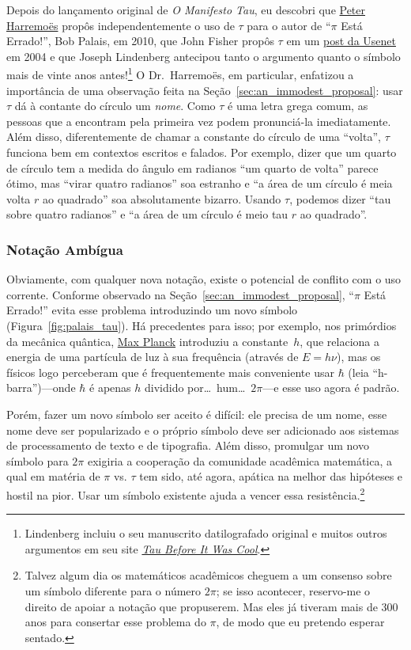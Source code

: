 {Depois do lançamento original de \emph{O Manifesto Tau}, eu descobri que \href{http://www.harremoes.dk/Peter/}{Peter Harremo\"{e}s} propôs independentemente o uso de $\tau$ para o autor de ``$\pi$ Está Errado!'', Bob Palais, em 2010, que John Fisher propôs $\tau$ em um \href{https://groups.google.com/forum/#!msg/sci.math/c-DHmJHSA0A/sLCoOtHB1UAJ}{post da Usenet} em 2004 e que Joseph Lindenberg antecipou tanto o argumento quanto o símbolo mais de vinte anos antes!\footnote{Lindenberg incluiu o seu manuscrito datilografado original e muitos outros argumentos em seu site \href{https://sites.google.com/site/taubeforeitwascool/}{\emph{Tau Before It Was Cool}}.} O Dr.~Harremo\"{e}s, em particular, enfatizou a importância de uma observação feita na Seção~\ref{sec:an_immodest_proposal}: usar $\tau$ dá à contante do círculo um \emph{nome}. Como $\tau$ é uma letra grega comum, as pessoas que a encontram pela primeira vez podem pronunciá-la imediatamente. Além disso, diferentemente de chamar a constante do círculo de uma ``volta'', $\tau$ funciona bem em contextos escritos e falados. Por exemplo, dizer que um quarto de círculo tem a medida do ângulo em radianos ``um quarto de volta'' parece ótimo, mas ``virar quatro radianos'' soa estranho e ``a área de um círculo é meia volta $r$ ao quadrado'' soa absolutamente bizarro. Usando $\tau$, podemos dizer ``tau sobre quatro radianos'' e ``a área de um círculo é meio tau $r$ ao quadrado''.

    \subsubsection{Notação Ambígua} %
    \label{sec:ambiguous_notation}


Obviamente, com qualquer nova notação, existe o potencial de conflito com o uso corrente. Conforme observado na Seção~\ref{sec:an_immodest_proposal}, ``$\pi$ Está Errado!'' evita esse problema introduzindo um novo símbolo (Figura~\ref{fig:palais_tau}). Há precedentes para isso; por exemplo, nos primórdios da mecânica quântica, \href{https://pt.wikipedia.org/wiki/Max_Planck}{Max Planck} introduziu a constante~$h$, que relaciona a energia de uma partícula de luz à sua frequência (através de $E = h\nu$), mas os físicos logo perceberam que é frequentemente mais conveniente usar $\hbar$ (leia ``h-barra'')---onde $\hbar$ é apenas $h$ dividido por\ldots\ hum\ldots\ $2\pi$---e esse uso agora é padrão.

Porém, fazer um novo símbolo ser aceito é difícil: ele precisa de um nome, esse nome deve ser popularizado e o próprio símbolo deve ser adicionado aos sistemas de processamento de texto e de tipografia. Além disso, promulgar um novo símbolo para $2\pi$ exigiria a cooperação da comunidade acadêmica matemática, a qual em matéria de $\pi$ vs. $\tau$ tem sido, até agora, apática na melhor das hipóteses e hostil na pior. Usar um símbolo existente ajuda a vencer essa resistência.\footnote{Talvez algum dia os matemáticos acadêmicos cheguem a um consenso sobre um símbolo diferente para o número $2\pi$; se isso acontecer, reservo-me o direito de apoiar a notação que propuserem. Mas eles já tiveram mais de 300 anos para consertar esse problema do $\pi$, de modo que eu pretendo esperar sentado.}

}
